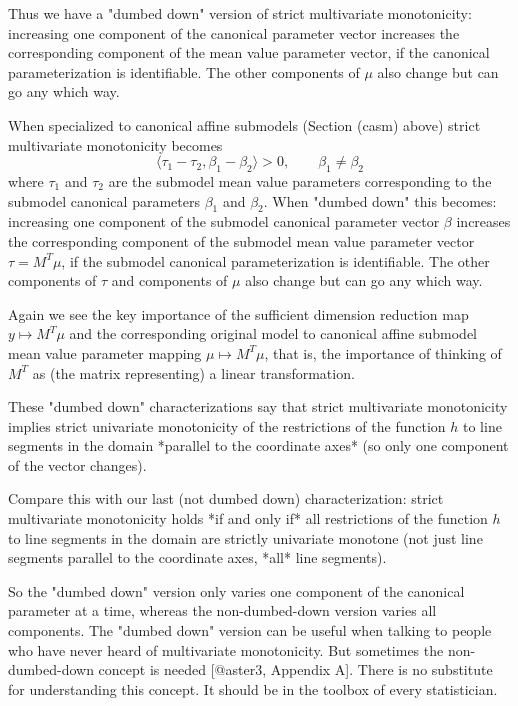 \documentclass[11pt]{article}
\begin{document}
Thus we have a "dumbed down" version of strict multivariate monotonicity:
increasing one component of the canonical parameter vector increases
the corresponding component of the mean value parameter vector, if the
canonical parameterization is identifiable.  The other components of $\mu$
also change but can go any which way.

When specialized to canonical affine submodels (Section \@ref(casm) above)
strict multivariate monotonicity becomes
$$
   \langle \tau_1 - \tau_2, \beta_1 - \beta_2 \rangle > 0,
   \qquad \beta_1 \neq \beta_2
$$
where $\tau_1$ and $\tau_2$ are the submodel mean value parameters
corresponding to the submodel canonical parameters $\beta_1$ and $\beta_2$.
When "dumbed down" this becomes:
increasing one component of the submodel canonical parameter vector $\beta$
increases the corresponding component of the submodel mean value parameter
vector $\tau = M^T \mu$, if the submodel canonical parameterization is
identifiable.  The other components of $\tau$ and components of $\mu$
also change but can go any which way.

Again we see the key importance of the sufficient dimension reduction
map $y \mapsto M^T \mu$ and the corresponding original model to canonical
affine submodel mean value parameter mapping $\mu \mapsto M^T \mu$,
that is, the importance of thinking of $M^T$ as (the matrix representing)
a linear transformation.

These "dumbed down" characterizations say that
strict multivariate monotonicity implies strict univariate monotonicity
of the restrictions of the function $h$ to line segments in the domain
*parallel to the coordinate axes* (so only one component of the vector
changes).

Compare this with our last (not dumbed down) characterization:
strict multivariate monotonicity holds *if and only if*
all restrictions of the function $h$ to line segments in the domain
are strictly univariate monotone (not just line segments parallel
to the coordinate axes, *all* line segments).

So the "dumbed down" version only varies one component of the canonical
parameter at a time, whereas the non-dumbed-down version varies all components.
The "dumbed down" version can be useful when talking to people who have
never heard of multivariate monotonicity.
But sometimes the non-dumbed-down concept is needed
[@aster3, Appendix A].
There is no substitute for understanding this concept.
It should be in the toolbox of every statistician.
\end{document}
